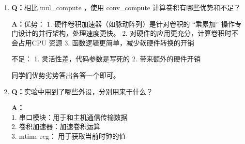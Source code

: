 \begin{enumerate}
    \textbf{A：}例如 $ \mathbf{A} \in \mathbb{R}^{4 \times 4}, \mathbf{x} \in \mathbb{R}^4$，
$ \mathbf{A} = \begin{pmatrix} 1 & 2 & 3 & 4 \\ 5 & 6 & 7 & 8 \\ 9 & 10 & 11 & 12 \\ 13 & 14 & 15 & 16 \end{pmatrix}, \mathbf{x} = (2, 0, 2, 5)^T $ \\
工作过程：将 $ \mathbf{A} $ 展开为 (1, 2, ... , 16)作为数据输入，$\mathbf{x}$ 的四个分量作为卷积核进行卷积运算，$ \mathbf{Ax} = (result\_mul[3],\ result\_mul[7],\ result\_mul[11],\ result\_mul[15])^T $

    \item \textbf{Q：}相比 mul\_compute ，使用 conv\_compute 计算卷积有哪些优势和不足？

    \textbf{A：}优势：
  1. 硬件卷积加速器（如脉动阵列）是针对卷积的 “乘累加” 操作专门设计的并行架构，处理速度更快。
  2. 对硬件的应用更充分，计算卷积时不会占用CPU 资源
  3. 函数逻辑更简单，减少软硬件转换的开销

不足：
  1. 灵活性差，代码参数是写死的
  2. 带来额外的硬件开销

    同学们优势劣势答出各答一个即可。

    \item \textbf{Q：}实验中用到了哪些外设，分别用来干什么？

    \textbf{A：}\\
1. 串口模块：用于和主机通信传输数据\\
2. 卷积加速器：加速卷积运算\\
3. mtime reg： 用于获取当前时钟的值

\end{enumerate}